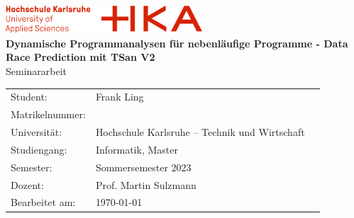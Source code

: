 \documentclass[11pt]{article}
\begin{document}
	\begin{titlepage}
		\begin{center}
			\includegraphics[width=0.55\textwidth]{images/hka-logo.png}\\[16ex]
			\huge{\textbf{Dynamische Programmanalysen für nebenläufige Programme - Data Race Prediction mit TSan V2}}\\[8ex]
			\LARGE{{Seminararbeit}}\\[14ex]
			\normalsize{}
			\begin{tabular}{lll}
				Student:            & \quad Frank Ling                                  & \\[2ex]
				Matrikelnummer:     & \quad 79496 & \\[2ex]     %
				Universität:        & \quad Hochschule Karlsruhe – Technik und Wirtschaft   &       \\[2ex]
				Studiengang:        & \quad Informatik, Master                &       \\[2ex]
				Semester:           & \quad Sommersemester 2023                             &       \\[2ex]
				Dozent:             & \quad Prof. Martin Sulzmann                       &       \\[2ex]
				Bearbeitet am:      & \quad \today                                  &       \\[2ex]
			\end{tabular}
		\end{center}
	\end{titlepage}
	\newpage
	\tableofcontents
	\newpage
\end{document}
